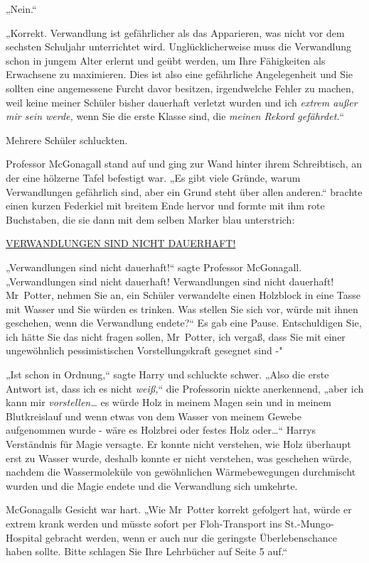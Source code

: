 {„Nein.“

„Korrekt. Verwandlung ist gefährlicher als das Apparieren, was nicht vor dem sechsten Schuljahr unterrichtet wird. Unglücklicherweise muss die Verwandlung schon in jungem Alter erlernt und geübt werden, um Ihre Fähigkeiten als Erwachsene zu maximieren. Dies ist also eine gefährliche Angelegenheit und Sie sollten eine angemessene Furcht davor besitzen, irgendwelche Fehler zu machen, weil keine meiner Schüler bisher dauerhaft verletzt wurden und ich \emph{extrem außer mir sein werde,} wenn Sie die erste Klasse sind, die \emph{meinen Rekord gefährdet.}“

Mehrere Schüler schluckten.

Professor McGonagall stand auf und ging zur Wand hinter ihrem Schreibtisch, an der eine hölzerne Tafel befestigt war. „Es gibt viele Gründe, warum Verwandlungen gefährlich sind, aber ein Grund steht über allen anderen.“ brachte einen kurzen Federkiel mit breitem Ende hervor und formte mit ihm rote Buchstaben, die sie dann mit dem selben Marker blau unterstrich:

\uline{VERWANDLUNGEN SIND NICHT DAUERHAFT!}

„Verwandlungen sind nicht dauerhaft!“ sagte Professor McGonagall. „Verwandlungen sind nicht dauerhaft! Verwandlungen sind nicht dauerhaft! Mr~Potter, nehmen Sie an, ein Schüler verwandelte einen Holzblock in eine Tasse mit Wasser und Sie würden es trinken. Was stellen Sie sich vor, würde mit ihnen geschehen, wenn die Verwandlung endete?“ Es gab eine Pause. Entschuldigen Sie, ich hätte Sie das nicht fragen sollen, Mr~Potter, ich vergaß, dass Sie mit einer ungewöhnlich pessimistischen Vorstellungskraft gesegnet sind -"

„Ist schon in Ordnung,“ sagte Harry und schluckte schwer. „Also die erste Antwort ist, dass ich es nicht \emph{weiß,}“ die Professorin nickte anerkennend, „aber ich kann mir \emph{vorstellen…} es würde Holz in meinem Magen sein und in meinem Blutkreislauf und wenn etwas von dem Wasser von meinem Gewebe aufgenommen wurde - wäre es Holzbrei oder festes Holz oder…“ Harrys Verständnis für Magie versagte. Er konnte nicht verstehen, wie Holz überhaupt erst zu Wasser wurde, deshalb konnte er nicht verstehen, was geschehen würde, nachdem die Wassermoleküle von gewöhnlichen Wärmebewegungen durchmischt wurden und die Magie endete und die Verwandlung sich umkehrte.

McGonagalls Gesicht war hart. „Wie Mr~Potter korrekt gefolgert hat, würde er extrem krank werden und müsste sofort per Floh-Transport ins St.-Mungo-Hospital gebracht werden, wenn er auch nur die geringste Überlebenschance haben sollte. Bitte schlagen Sie Ihre Lehrbücher auf Seite 5 auf.“

}
